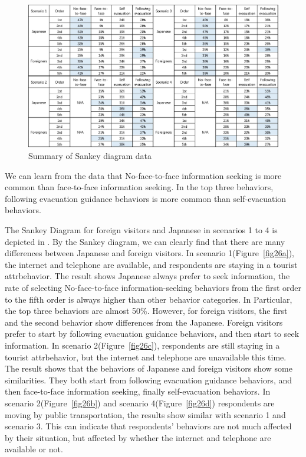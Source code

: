 \begin{figure}[h]
  \includegraphics[width=\linewidth]{Figure/Figure28.jpg}
  \centering
  \caption{Summary of Sankey diagram data}
  \label{fig28}
\end{figure}

We can learn from the data that No-face-to-face information seeking is more common than face-to-face information seeking. In the top three behaviors, following evacuation guidance behaviors is more common than self-evacuation behaviors. 

The Sankey Diagram for foreign visitors and Japanese in scenarios 1 to 4 is depicted in . By the Sankey diagram, we can clearly find that there are many differences between Japanese and foreign visitors. In scenario 1(Figure~\ref{fig26a}),  the internet and telephone are available, and respondents are staying in a tourist attrbehavior. The result shows Japanese always prefer to seek information, the rate of selecting  No-face-to-face information-seeking behaviors from the first order to the fifth order is always higher than other behavior categories. In Particular, the top three behaviors are almost 50\%.  However, for foreign visitors, the first and the second behavior show differences from the Japanese. Foreign visitors prefer to start by following evacuation guidance behaviors, and then start to seek information.  In scenario 2(Figure~\ref{fig26c}), respondents are still staying in a tourist attrbehavior, but the internet and telephone are unavailable this time. The result shows that the behaviors of Japanese and foreign visitors show some similarities. They both start from following evacuation guidance behaviors, and then face-to-face information seeking, finally self-evacuation behaviors.  In scenario 2(Figure~\ref{fig26b}) and scenario 4(Figure~\ref{fig26d}) respondents are moving by public transportation, the results show similar with scenario 1 and scenario 3. This can indicate that respondents' behaviors are not much affected by their situation, but affected by whether the internet and telephone are available or not. 

